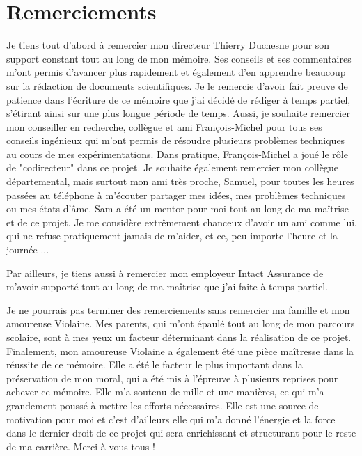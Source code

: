 \chapter*{Remerciements}        %
\label{chap:remerciements}      %

Je tiens tout d'abord à remercier mon directeur Thierry Duchesne pour son support constant tout au long de mon mémoire. Ses conseils et ses commentaires m'ont permis d'avancer plus rapidement et également d'en apprendre beaucoup sur la rédaction de documents scientifiques. Je le remercie d'avoir fait preuve de patience dans l'écriture de ce mémoire que j'ai décidé de rédiger à temps partiel, s'étirant ainsi sur une plus longue période de temps. Aussi, je souhaite remercier mon conseiller en recherche, collègue et ami François-Michel pour tous ses conseils ingénieux qui m'ont permis de résoudre plusieurs problèmes techniques au cours de mes expérimentations. Dans \DIFdelbegin {}\DIFdelend \DIFaddbegin {}\DIFaddend pratique, François-Michel a joué le rôle de "codirecteur" dans ce projet. Je souhaite également remercier mon collègue départemental, mais surtout mon ami très proche, Samuel, pour toutes les heures passées au téléphone à m'écouter partager mes idées, mes problèmes techniques ou mes états d'âme. Sam a été un mentor pour moi tout au long de ma maîtrise et de ce projet. Je me considère extrêmement chanceux d'avoir un ami comme lui, qui ne refuse pratiquement jamais de m'aider, et ce, peu importe l'heure et la journée ... 

Par ailleurs, je tiens aussi à remercier mon employeur Intact Assurance de m'avoir supporté tout au long de ma maîtrise que j'ai faite à temps partiel.

Je ne pourrais pas terminer des remerciements sans remercier ma famille et mon amoureuse Violaine. Mes parents, qui m'ont épaulé tout au long de mon parcours scolaire, sont à mes yeux un facteur déterminant dans la réalisation de ce projet. Finalement, mon amoureuse Violaine a également été une pièce maîtresse dans la réussite de ce mémoire. Elle a été le facteur le plus important dans la préservation de mon moral, qui a été mis à l'épreuve à plusieurs reprises pour achever ce mémoire. Elle m'a soutenu de mille et une manières, ce qui m'a grandement poussé à mettre les efforts nécessaires. Elle est une source de motivation pour moi et c'est d'ailleurs elle qui m'a donné l'énergie et la force dans le dernier droit de ce projet qui sera enrichissant et structurant pour le reste de ma carrière. Merci à vous tous ! 

